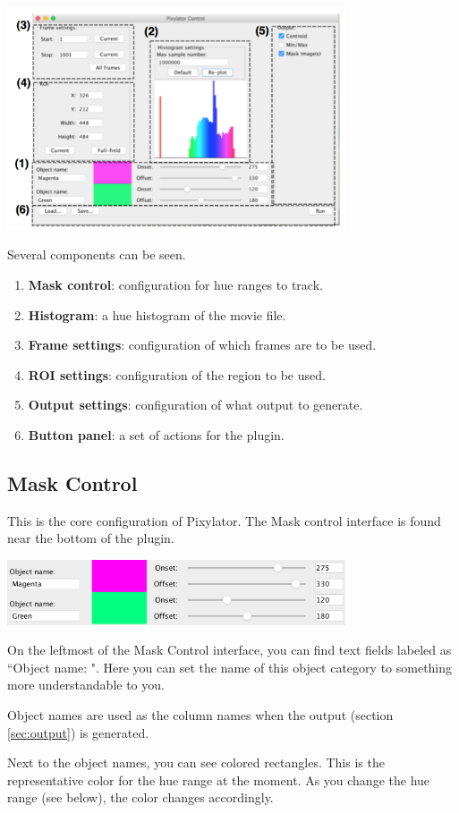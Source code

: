 \documentclass[a4paper,oneside,10pt]{article}
\newcommand{\secref}[1]{(section \ref{sec:#1})}
\begin{document}
\includegraphics[width=10cm]{annotated.png}

Several components can be seen.
\begin{enumerate}
\item {\bf Mask control}: configuration for hue ranges to track.
\item {\bf Histogram}: a hue histogram of the movie file.
\item {\bf Frame settings}: configuration of which frames are to be used.
\item {\bf ROI settings}: configuration of the region to be used.
\item {\bf Output settings}: configuration of what output to generate.
\item {\bf Button panel}: a set of actions for the plugin.
\end{enumerate}

\subsection{Mask Control}
\label{sec:mask}
This is the core configuration of Pixylator. The Mask control interface is found near the bottom of the plugin. 

\includegraphics[width=10cm]{maskcontrol.png}

On the leftmost of the Mask Control interface, you can find text fields labeled as ``Object name: ". Here you can set the name of this object category to something more understandable to you.

Object names are used as the column names when the output \secref{output} is generated.

Next to the object names, you can see colored rectangles. This is the representative color for the hue range at the moment. As you change the hue range (see below), the color changes accordingly.
\end{document}
